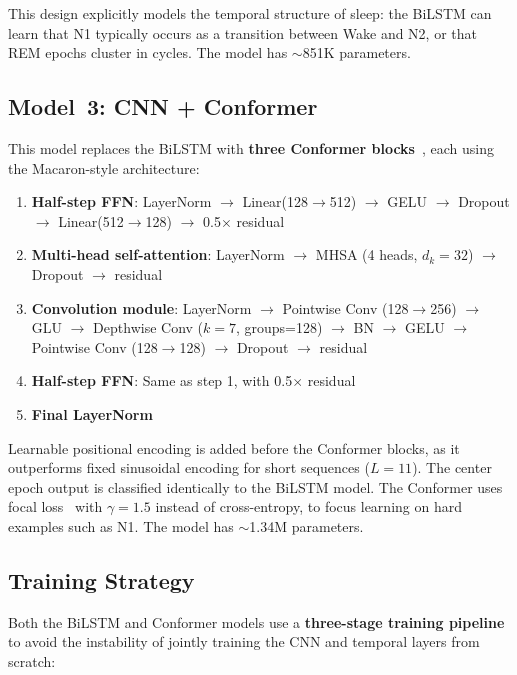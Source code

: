 \documentclass[final]{article}
\begin{document}
This design explicitly models the temporal structure of sleep: the BiLSTM can learn that N1 typically occurs as a transition between Wake and N2, or that REM epochs cluster in cycles. The model has $\sim$851K parameters.

\subsection{Model~3: CNN + Conformer}

This model replaces the BiLSTM with \textbf{three Conformer blocks}~\cite{Gulati2020}, each using the Macaron-style architecture:

\begin{enumerate}[nosep, leftmargin=*]
  \item \textbf{Half-step FFN}: LayerNorm $\to$ Linear(128$\to$512) $\to$ GELU $\to$ Dropout $\to$ Linear(512$\to$128) $\to$ 0.5$\times$ residual
  \item \textbf{Multi-head self-attention}: LayerNorm $\to$ MHSA (4 heads, $d_k = 32$) $\to$ Dropout $\to$ residual
  \item \textbf{Convolution module}: LayerNorm $\to$ Pointwise Conv (128$\to$256) $\to$ GLU $\to$ Depthwise Conv ($k\!=\!7$, groups=128) $\to$ BN $\to$ GELU $\to$ Pointwise Conv (128$\to$128) $\to$ Dropout $\to$ residual
  \item \textbf{Half-step FFN}: Same as step 1, with 0.5$\times$ residual
  \item \textbf{Final LayerNorm}
\end{enumerate}

Learnable positional encoding is added before the Conformer blocks, as it outperforms fixed sinusoidal encoding for short sequences ($L = 11$). The center epoch output is classified identically to the BiLSTM model. The Conformer uses focal loss~\cite{Lin2017} with $\gamma = 1.5$ instead of cross-entropy, to focus learning on hard examples such as N1. The model has $\sim$1.34M parameters.

\subsection{Training Strategy}
\label{sec:training}

Both the BiLSTM and Conformer models use a \textbf{three-stage training pipeline} to avoid the instability of jointly training the CNN and temporal layers from scratch:
\end{document}
